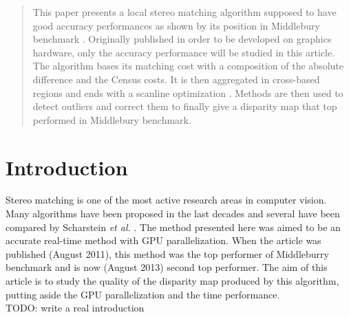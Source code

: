 \documentclass{ipol}
\begin{document}
\begin{abstract}
This paper presents a local stereo matching algorithm \cite{adCensus} supposed to have good accuracy performances as shown by its position in Middlebury benchmark \cite{middleBench}. Originally published in order to be developed on graphics hardware, only the accuracy performance will be studied in this article. The algorithm bases its matching cost with a composition of the absolute difference and the Census costs. It is then aggregated in cross-based regions \cite{costAggreg} and ends with a scanline optimization \cite{scanlineOptim}. Methods are then used to detect outliers and correct them to finally give a disparity map that top performed in Middlebury benchmark.
\end{abstract} 

\section{Introduction}

Stereo matching is one of the most active research areas in computer vision. Many algorithms have been proposed in the last decades and several have been compared by Scharstein \textit{et al.} \cite{stereoTaxonomy}. The method presented here \cite{adCensus} was aimed to be an accurate real-time method with GPU parallelization. When the article was published (August 2011), this method was the top performer of Middleburry benchmark \cite{middleBench} and is now (August 2013) second top performer. The aim of this article is to study the quality of the disparity map produced by this algorithm, putting aside the GPU parallelization and the time performance.\\

TODO: write a real introduction
\end{document}
